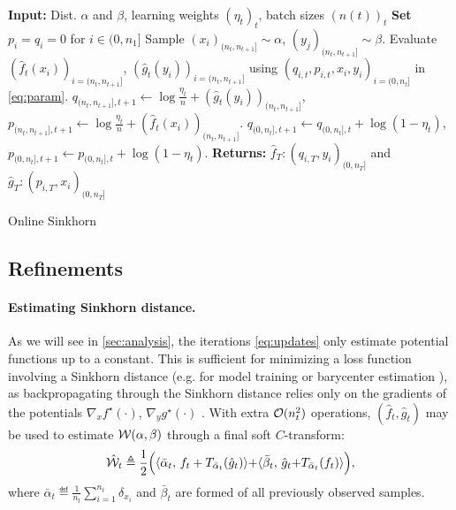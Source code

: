 \begin{algorithm}[t]
    \begin{algorithmic}
    \State \textbf{Input:} Dist. $\alpha$ and $\beta$, learning weights ${(\eta_t)}_t$, batch sizes ${(n(t))}_t$
    \textbf{Set} $p_i = q_i = 0$ for $i \in (0, n_1]$
        \State Sample $(x_i)_{(n_t, n_{t+1}]} \sim \alpha$, $(y_j)_{(n_t, n_{t+1}]} \sim \beta$.
            \State Evaluate $(\hat f_t(x_i))_{i=(n_t, n_{t+1}]}$,
             $(\hat g_t(y_i))_{i=(n_t, n_{t+1}]}$ using $(q_{i,t}, p_{i,t}, x_i, y_i)_{i=(0,n_{t}]}$ in \eqref{eq:param}.
             \State $q_{(n_t, n_{t+1}],t+1} {\gets} \log \frac{\eta_t}{n}
             + (\hat g_t(y_i))_{(n_t, n_{t+1}]}$,
             \qquad $p_{(n_t, n_{t+1}],t+1} {\gets} \log \frac{\eta_t}{n} 
             + (\hat f_t(x_i))_{(n_t, n_{t+1}]}$.
            \State $q_{(0, n_t],t+1} \gets q_{(0, n_t],t} + \log(1 - \eta_t)$, \qquad
            $p_{(0, n_t],t+1} \gets p_{(0, n_t],t} + \log(1 - \eta_t)$.
    \EndFor
    \State \textbf{Returns:} $\hat f_T : (q_{i,T}, y_i)_{(0, n_T]}$ and
    $\hat g_T : (p_{i,T}, x_i)_{(0, n_T]}$
    \end{algorithmic}
    \caption{Online Sinkhorn}\label{alg:online_sinkhorn}
\end{algorithm}


\subsection{Refinements}

\paragraph{Estimating Sinkhorn distance.} 

As we will see in \autoref{sec:analysis}, the iterations \eqref{eq:updates} only estimate potential functions up to a
constant. This is sufficient for minimizing a loss function involving a Sinkhorn
distance (e.g. for model training or barycenter estimation \citep{staib2017parallel}), as backpropagating through the Sinkhorn distance
relies only on the gradients of the potentials $\nabla_x f^\star(\cdot)$,
$\nabla_y g^\star(\cdot)$ \citep[e.g.][]{cuturi2018semidual}. With extra
$\Oo(n_t^2)$ operations, $(\hat f_t, \hat g_t)$ may be used to
estimate $\Ww(\alpha,\beta)$ through a final soft $C$-transform:
\begin{equation}\label{eq-dist-est}
    \hat \Ww_t \triangleq \frac{1}{2}\Big(\dotp{\bar \alpha_t}{f_t + 
    \Ctrans{\hat g_t}{\bar \alpha_t}}
     {+} \dotp{\bar \beta_t}{\hat g_t {+} \Ctrans{f_t}{\bar \alpha_t}}\Big),
\end{equation}
where $\bar \alpha_t \eqdef \frac{1}{n_{t}}\sum_{i=1}^{n_{t}} \delta_{x_i}$
and $\bar \beta_t$ are formed of all previously observed samples.


